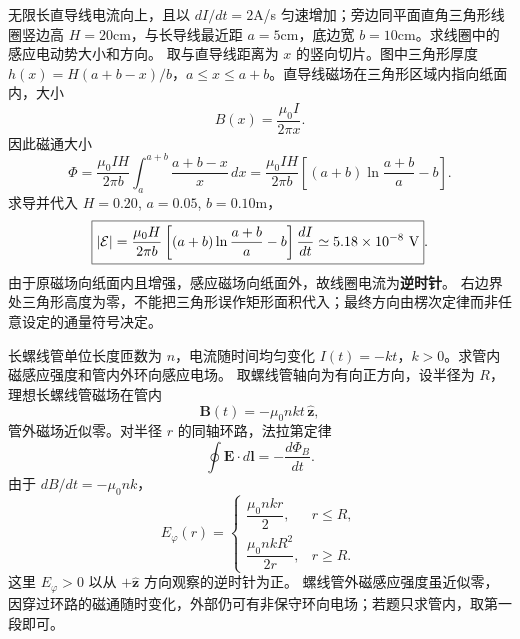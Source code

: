\problemtext 无限长直导线电流向上，且以 $dI/dt=2$A/s 匀速增加；旁边同平面直角三角形线圈竖边高 $H=20$cm，与长导线最近距 $a=5$cm，底边宽 $b=10$cm。求线圈中的感应电动势大小和方向。
\workings 取与直导线距离为 $x$ 的竖向切片。图中三角形厚度 $h(x)=H(a+b-x)/b$，$a\le x\le a+b$。直导线磁场在三角形区域内指向纸面内，大小
\[B(x)=\frac{\mu_0I}{2\pi x}.\]
因此磁通大小
\[
\Phi=\frac{\mu_0 I H}{2\pi b}
\int_a^{a+b}\frac{a+b-x}{x}\,dx
=\frac{\mu_0 I H}{2\pi b}
\left[(a+b)\ln\frac{a+b}{a}-b\right].
\]
求导并代入 $H=0.20$, $a=0.05$, $b=0.10$m，
\[
\boxed{|\mathcal E|=\frac{\mu_0 H}{2\pi b}
\left[(a+b)\ln\frac{a+b}{a}-b\right]\frac{dI}{dt}
\simeq5.18\times10^{-8}\ {\rm V}}.
\]
由于原磁场向纸面内且增强，感应磁场向纸面外，故线圈电流为\textbf{逆时针}。
\crosscheck 右边界处三角形高度为零，不能把三角形误作矩形面积代入；最终方向由楞次定律而非任意设定的通量符号决定。

\problemtext 长螺线管单位长度匝数为 $n$，电流随时间均匀变化 $I(t)=-kt$，$k>0$。求管内磁感应强度和管内外环向感应电场。
\workings 取螺线管轴向为有向正方向，设半径为 $R$，理想长螺线管磁场在管内
\[\boxed{\bm B(t)=-\mu_0nkt\,\hat{\bm z}},\]
管外磁场近似零。对半径 $r$ 的同轴环路，法拉第定律
\[\oint\bm E\cdot d\bm l=-\frac{d\Phi_B}{dt}.\]
由于 $dB/dt=-\mu_0nk$，
\[
\boxed{E_\varphi(r)=
\begin{cases}
\dfrac{\mu_0nkr}{2},&r\le R,\\[4pt]
\dfrac{\mu_0nkR^2}{2r},&r\ge R.
\end{cases}}
\]
这里 $E_\varphi>0$ 以从 $+\hat{\bm z}$ 方向观察的逆时针为正。
\crosscheck 螺线管外磁感应强度虽近似零，因穿过环路的磁通随时变化，外部仍可有非保守环向电场；若题只求管内，取第一段即可。
